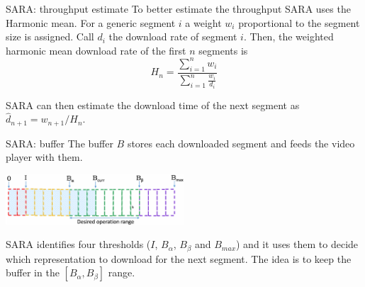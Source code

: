 \documentclass[10pt]{beamer}
\begin{document}
\begin{frame}[fragile]{SARA: throughput estimate}
To better estimate the throughput SARA uses the Harmonic mean. For a generic segment $i$ a weight $w_i$ proportional to the segment size is assigned. Call $d_i$ the download rate of segment $i$. Then, the weighted harmonic mean download rate of the first $n$ segments is
\[
H_n=\frac{\sum_{i=1}^n w_i}{\sum_{i=1}^n \frac{w_i}{d_i}}
\]

SARA can then estimate the download time of the next segment as $\hat{d}_{n+1}=w_{n+1}/H_n$.
\end{frame}

\begin{frame}[fragile]{SARA: buffer}
The buffer $B$ stores each downloaded segment and feeds the video player with them.

\centering
\includegraphics[width=0.5\textwidth]{img/sara_buffer_thresholds}

SARA identifies four thresholds ($I$, $B_{\alpha}$, $B_{\beta}$ and $B_{max}$) and it uses them to decide which representation to download for the next segment. The idea is to keep the buffer in the $[B_\alpha, B_\beta]$ range.
\end{frame}
\end{document}
